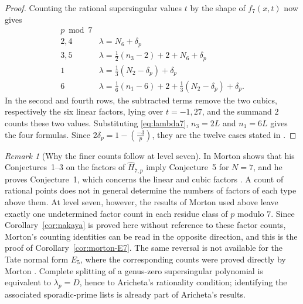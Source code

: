\documentclass[11pt,a4paper]{article}
\theoremstyle{remark}\newtheorem{remark}[theorem]{Remark}
\numberwithin{equation}{section}
\newcommand{\leg}[2]{\left(\frac{#1}{#2}\right)}
\begin{document}
\begin{proof}
	Counting the rational supersingular values $t$ by the shape of $f_7(x,t)$ now gives
	\[
	\begin{array}{c|l}
		p\bmod7&\\\hline
		2,4&\lambda=N_6+\delta_p\\[2pt]
		3,5&\lambda=\tfrac12(n_3-2)+2+N_6+\delta_p\\[2pt]
		1&\lambda=\tfrac13(N_2-\delta_p)+\delta_p\\[2pt]
		6&\lambda=\tfrac16(n_1-6)+2+\tfrac13(N_2-\delta_p)+\delta_p.
	\end{array}
	\]
	In the second and fourth rows, the subtracted terms remove the two cubics, respectively the six linear factors, lying over $t=-1,27$, and the summand $2$ counts these two values. Substituting \eqref{eq:lambda7}, $n_3=2L$ and $n_1=6L$ gives the four formulas. Since $2\delta_p=1-\leg{-3}{p}$, they are the twelve cases stated in \cite[Section~2]{Morton7}.
\end{proof}

\begin{remark}[Why the finer counts follow at level seven]\label{rem:morton}
	In \cite[Section~3]{Morton7} Morton shows that his Conjectures~1--3 on the factors of $\widehat H_{7,p}$ imply Conjecture~5 for $N=7$, and he proves Conjecture~1, which concerns the linear and cubic factors \cite[Theorem~A]{Morton7}. A count of rational points does not in general determine the numbers of factors of each type above them. At level seven, however, the results of Morton used above leave exactly one undetermined factor count in each residue class of $p$ modulo $7$. Since Corollary~\ref{cor:nakaya} is proved here without reference to these factor counts, Morton's counting identities can be read in the opposite direction, and this is the proof of Corollary~\ref{cor:morton-E7}. The same reversal is not available for the Tate normal form $E_5$, where the corresponding counts were proved directly by Morton \cite{Morton5a,Morton5b}. Complete splitting of a genus-zero supersingular polynomial is equivalent to $\lambda_p=D$, hence to Aricheta's rationality condition; identifying the associated sporadic-prime lists is already part of Aricheta's results.
\end{remark}
	
\end{document}
